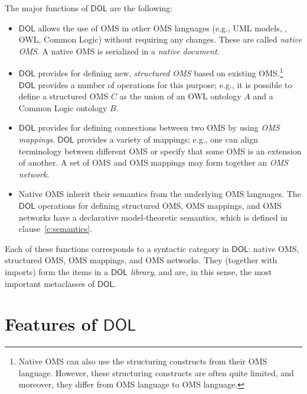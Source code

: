 \documentclass[10pt,fleqn,final]{scrreprt}
\newcommand*{\DOL}{\ensuremath{\mathsf{DOL}}\xspace}
\newcommand{\clauserefname}{clause}
\newcommand{\cref}[1]{\clauserefname~\ref{#1}}
\newenvironment{definitions}[0]{\medskip }{}
\begin{document}
\begin{definitions}
The major functions of \DOL are the following: 
\begin{itemize}
		\item \DOL allows the use of OMS in other OMS languages (e.g., UML models, \CASL, 
		OWL, Common Logic) without requiring any changes. These are called \emph{native OMS}.  A native OMS is serialized in a \emph{native document}.   
		\item \DOL provides for defining new, \emph{structured OMS} based on existing OMS.\footnote{Native OMS can also use the structuring constructs from their OMS language. However, these structuring constructs are often quite limited, and moreover, they differ from OMS language to OMS language.} \DOL provides a number of operations for this purpose; e.g.,
		it is possible to define a structured OMS $C$ as the union of an OWL
		ontology $A$ and a Common Logic ontology $B$.
		\item \DOL provides for defining connections between two OMS by using 
		\emph{OMS mappings}. \DOL provides a variety of mappings; e.g.,  one can align terminology 
		between different OMS or specify that some OMS is an extension of another. A set of OMS
		and OMS mappings may form together an \emph{OMS network}.
		\item Native OMS inherit their semantics from the underlying OMS languages. The \DOL
		 operations for defining structured OMS, 
		OMS mappings, and OMS networks have a declarative model-theoretic semantics, which is 
		 defined in \cref{c:semantics}.  
\end{itemize}
 
 Each of these functions corresponds to a syntactic category in \DOL: native OMS, structured
 OMS, OMS mappings, and OMS networks. They (together with imports) form the items in a
\emph{\DOL library}, and are, in this sense, the most important metaclasses of \DOL. 


 





\section{Features of \DOL}\label{c:req:overview}


\end{definitions}
\end{document}
